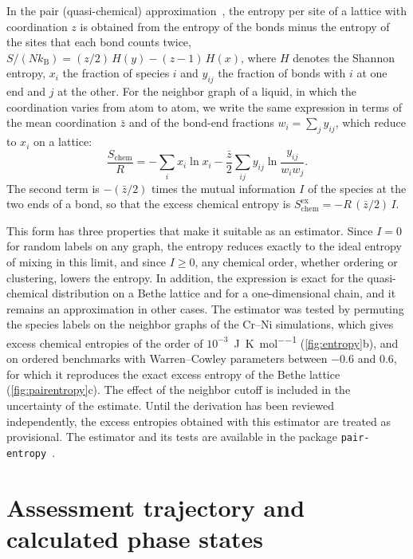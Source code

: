 In the pair (quasi-chemical) approximation~\cite{guggenheim1944mixtures,kikuchi1951cooperative}, the entropy per site of a lattice with coordination $z$ is obtained from the entropy of the bonds minus the entropy of the sites that each bond counts twice, $S/(N k_{\mathrm{B}}) = (z/2)\,H(y) - (z-1)\,H(x)$, where $H$ denotes the Shannon entropy, $x_i$ the fraction of species $i$ and $y_{ij}$ the fraction of bonds with $i$ at one end and $j$ at the other. For the neighbor graph of a liquid, in which the coordination varies from atom to atom, we write the same expression in terms of the mean coordination $\bar z$ and of the bond-end fractions $w_i = \sum_j y_{ij}$, which reduce to $x_i$ on a lattice:
\begin{equation}
\frac{S_{\mathrm{chem}}}{R} = -\sum_i x_i \ln x_i - \frac{\bar z}{2}\sum_{ij} y_{ij}\ln\frac{y_{ij}}{w_i w_j}.
\end{equation}
The second term is $-(\bar z/2)$ times the mutual information $I$ of the species at the two ends of a bond, so that the excess chemical entropy is $S^{\mathrm{ex}}_{\mathrm{chem}} = -R\,(\bar z/2)\,I$.

This form has three properties that make it suitable as an estimator. Since $I = 0$ for random labels on any graph, the entropy reduces exactly to the ideal entropy of mixing in this limit, and since $I \ge 0$, any chemical order, whether ordering or clustering, lowers the entropy. In addition, the expression is exact for the quasi-chemical distribution on a Bethe lattice and for a one-dimensional chain, and it remains an approximation in other cases. The estimator was tested by permuting the species labels on the neighbor graphs of the Cr--Ni simulations, which gives excess chemical entropies of the order of $10^{-3}$~\unit{\J\per\K\per\mole} (\cref{fig:entropy}b), and on ordered benchmarks with Warren--Cowley parameters between $-0.6$ and $0.6$, for which it reproduces the exact excess entropy of the Bethe lattice (\cref{fig:pairentropy}c). The effect of the neighbor cutoff is included in the uncertainty of the estimate. Until the derivation has been reviewed independently, the excess entropies obtained with this estimator are treated as provisional. The estimator and its tests are available in the package \texttt{pair-entropy}~\cite{pairentropy}.


\section{Assessment trajectory and calculated phase states}
\label{app:assessment}

